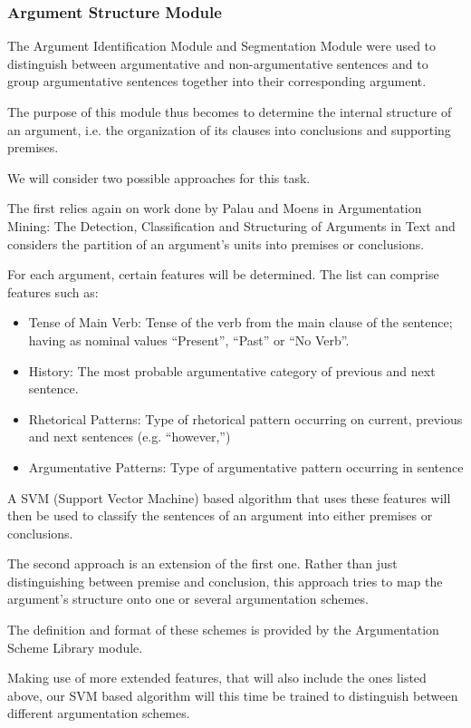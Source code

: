 \subsubsection{Argument Structure Module}
\par
The Argument Identification Module and Segmentation Module were used to distinguish between argumentative and non-argumentative sentences and to group argumentative sentences together into their corresponding argument.
\par
The purpose of this module thus becomes to determine the internal structure of an argument, i.e. the organization of its clauses into conclusions and supporting premises. 
\par
We will consider two possible approaches for this task.
\par
The first relies again on work done by Palau and Moens\cite{Palau} in Argumentation Mining: The Detection, Classification and Structuring of Arguments in Text and considers the partition of an argument's units into premises or conclusions.
\par
For each argument, certain features will be determined. The list can comprise features such as:
\begin{itemize}
\item Tense of Main Verb: Tense of the verb from the main clause of the sentence; having as nominal values ``Present'', ``Past'' or ``No Verb''.
\item History: The most probable argumentative category of previous and next sentence.
\item Rhetorical Patterns: Type of rhetorical pattern occurring on current, previous and next sentences (e.g. ``however,'')
\item Argumentative Patterns: Type of argumentative pattern occurring in sentence
\end{itemize}
A SVM (Support Vector Machine) based algorithm that uses these features will then be used to classify the sentences of an argument into either premises or conclusions.
\par
The second approach is an extension of the first one. Rather than just distinguishing between premise and conclusion, this approach tries to map the argument's structure onto one or several argumentation schemes. 
\par
The definition and format of these schemes is provided by the Argumentation Scheme Library module. 
\par
Making use of more extended features, that will also include the ones listed above, our SVM based algorithm will this time be trained to distinguish between different argumentation schemes. 
